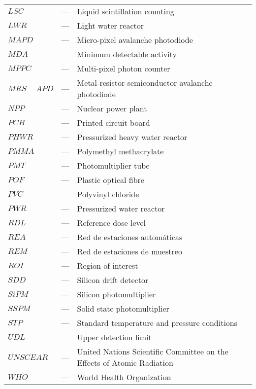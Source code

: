 \begin{longtable}{p{25mm} c p{120mm} }
$LSC$ & --- & Liquid scintillation counting\\
$LWR$ & --- & Light water reactor\\
$MAPD$ & --- & Micro-pixel avalanche photodiode\\
$MDA$ & --- & Minimum detectable activity\\
$MPPC$ & --- & Multi-pixel photon counter\\
$MRS-APD$ & --- & Metal-resistor-semiconductor avalanche photodiode\\
$NPP$ & --- & Nuclear power plant\\
$PCB$ & --- & Printed circuit board\\
$PHWR$ & --- & Pressurized heavy water reactor\\
$PMMA$ & --- & Polymethyl methacrylate\\
$PMT$ & --- & Photomultiplier tube\\
$POF$ & --- & Plastic optical fibre\\
$PVC$ & --- & Polyvinyl chloride\\
$PWR$ & --- & Pressurized water reactor\\
$RDL$ & --- & Reference dose level\\
$REA$ & --- & Red de estaciones automáticas\\
$REM$ & --- & Red de estaciones de muestreo\\
$ROI$ & --- & Region of interest\\
$SDD$ & --- & Silicon drift detector\\
$SiPM$ & --- & Silicon photomultiplier\\
$SSPM$ & --- & Solid state photomultiplier\\
$STP$ & --- & Standard temperature and pressure conditions\\
$UDL$ & --- & Upper detection limit\\
$UNSCEAR$ & --- & United Nations Scientific Committee on the Effects
\newline
of Atomic Radiation\\
$WHO$ & --- & World Health Organization\\


\end{longtable}
